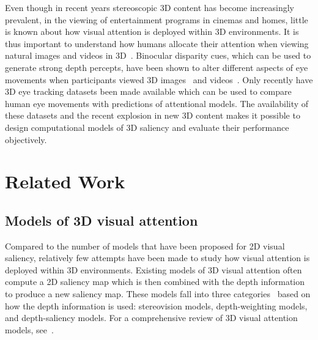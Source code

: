 Even though in recent years stereoscopic 3D content has become increasingly prevalent, \eg in the viewing of entertainment programs in cinemas and homes, little is known about how visual attention is deployed within 3D environments. It is thus important to understand how humans allocate their attention when viewing natural images and videos in 3D~\citep{LeCallet_Niebur13}. Binocular disparity cues, which can be used to generate strong depth percepts, have been shown to alter different aspects of eye movements when participants viewed 3D images~\citep{Jansen_etal09} and videos~\citep{Huynh_Schiatti11}. Only recently have 3D eye tracking datasets been made available which can be used to compare human eye movements with predictions of attentional models. The availability of these datasets and the recent explosion in new 3D content makes it possible to design computational models of 3D saliency and evaluate their performance objectively.


\section{Related Work}

\subsection{Models of 3D visual attention}

Compared to the number of models that have been proposed for 2D visual saliency, relatively few attempts have been made to study how visual attention is deployed within 3D environments. Existing models of 3D visual attention often compute a 2D saliency map which is then combined with the depth information to produce a new saliency map. These models fall into three categories~\citep{Wang_etal13} based on how the depth information is used: stereovision models, depth-weighting models, and depth-saliency models. For a comprehensive review of 3D visual attention models, see~\cite{Wang_etal13,Ma_Hang15}.

